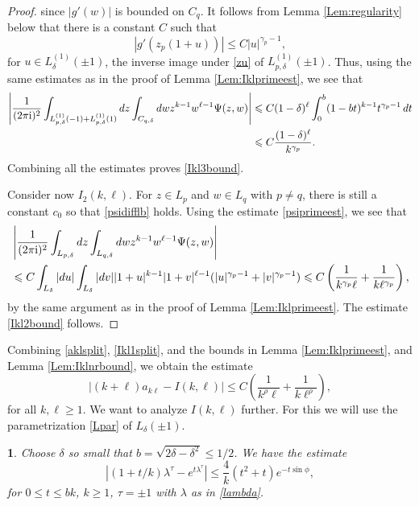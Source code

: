 \documentclass{article}
\numberwithin{equation}{section}
\numberwithin{figure}{section}
\theoremstyle{plain}
\theoremstyle{plain}
\newtheorem{lemma}[thm]{\protect\lemmaname}
\numberwithin{thm}{section}
\theoremstyle{remark}
\providecommand{\lemmaname}{Lemma}
\newcommand{\I}{{\rm i}}
\let \le \leqslant
\let \ge \geqslant
\begin{document}
\begin{proof}
since $|g'(w)|$ is bounded on $C_q$. It follows from Lemma \ref{Lem:regularity} below that there is a constant $C$ such that
\begin{equation}\label{psiprimeest}
|g'(z_p(1+u))|\le C|u|^{\gamma_p-1},
\end{equation}
for $u\in L_{\delta}^{(1)}(\pm 1)$, the inverse image under \eqref{zu} of $L_{p,\delta}^{(1)}(\pm 1)$. Thus, using the same estimates as in the proof of 
Lemma \ref{Lem:Iklprimeest}, we see that
\begin{align*}
\left|\frac 1{(2\pi\I)^2}\int_{L_{p,\delta}^{(1)}(-1)+L_{p,\delta}^{(1)}(1)}dz \int_{C_{q,\delta}}dwz^{k-1}w^{\ell-1}\Psi(z,w)\right|&\le
C(1-\delta)^\ell\int_0^b(1-bt)^{k-1}t^{\gamma_p-1}\,dt\\
&\le C\frac{(1-\delta)^\ell}{k^{\gamma_p}}.
\end{align*}
Combining all the estimates proves \eqref{Ikl3bound}.

Consider now $I_2(k,\ell)$. For $z\in L_p$ and $w\in L_q$ with $p\neq q$, there is still a constant $c_0$ so that \eqref{psidifflb} holds. Using the estimate
\eqref{psiprimeest}, we see that
\begin{align*}
&\left|\frac 1{(2\pi\I)^2}\int_{L_{p,\delta}}dz\int_{L_{q,\delta}}dwz^{k-1}w^{\ell-1}\Psi(z,w)\right|\\
&\le C\int_{L_\delta}|du|\int_{L_\delta}|dv||1+u|^{k-1}|1+v|^{\ell-1}(|u|^{\gamma_p-1}+|v|^{\gamma_p-1})\le C\left(\frac 1{k^{\gamma_p}\ell}+
\frac 1{k\ell^{\gamma_p}}\right),
\end{align*}
by the same argument as in the proof of Lemma \ref{Lem:Iklprimeest}. The estimate \ref{Ikl2bound} follows.
\end{proof}

Combining \eqref{aklsplit}, \eqref{Ikl1split}, and the bounds in Lemma \ref{Lem:Iklprimeest}, and Lemma \ref{Lem:Iklnrbound}, we obtain the estimate
\begin{equation}\label{aklest1}
|(k+\ell)a_{k\ell}-I(k,\ell)|\le C\left(\frac 1{k^\rho\ell}+\frac 1{k\ell^\rho}\right),
\end{equation}
for all $k,\ell\ge 1$. We want to analyze $I(k,\ell)$ further. For this we will use the parametrization \eqref{Lpar} of $L_\delta(\pm 1)$. 

\begin{lemma}\label{Lem:expest}
Choose $\delta$ so small that $b=\sqrt{2\delta-\delta^2}\le 1/2$. We have the estimate
\begin{equation}\label{expest}
\left|(1+t/k)\lambda^\tau-e^{t\lambda^\tau}\right|\le\frac 4k(t^2+t)e^{-t\sin\phi},
\end{equation}
for $0\le t\le bk$, $k\ge 1$, $\tau=\pm1$ with $\lambda$ as in \eqref{lambda}.
\end{lemma}
\end{document}
